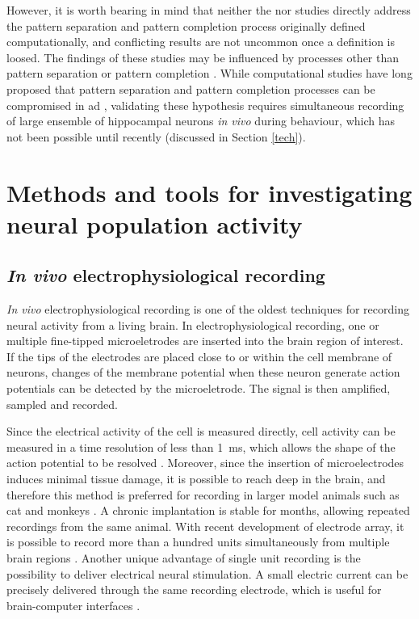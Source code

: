 However, it is worth bearing in mind that neither the \citet{palmer11} nor \citet{ally13} studies directly address the pattern separation and pattern completion process originally defined computationally, and conflicting results are not uncommon once a definition is loosed.  The findings of these studies may be influenced by processes other than pattern separation or pattern completion \citep{santoro13}. While computational studies have long proposed that pattern separation and pattern completion processes can be compromised in \gls{ad} \citep{horn93, hasselmo94, hasselmo97}, validating these hypothesis requires simultaneous recording of large ensemble of hippocampal neurons \textit{in vivo} during behaviour, which has not been possible until recently (discussed in Section \ref{tech}).  

\section{Methods and tools for investigating neural population activity \label{tech}}
\subsection{\textit{In vivo} electrophysiological recording}
\textit{In vivo} electrophysiological recording is one of the oldest techniques for recording neural activity from a living brain. In electrophysiological recording, one or multiple fine-tipped microeletrodes are inserted into the brain region of interest. If the tips of the electrodes are placed close to or within the cell membrane of neurons, changes of the membrane potential when these neuron generate action potentials can be detected by the microeletrode. The signal is then amplified, sampled and recorded. 

Since the electrical activity of the cell is measured directly, cell activity can be measured in a time resolution of less than \SI{1}{\ms}, which allows the shape of the action potential to be resolved \citep{lutcke13}. Moreover, since the insertion of microelectrodes induces minimal tissue damage, it is possible to reach deep in the brain, and therefore this method is preferred for recording in larger model animals such as cat and monkeys \citep{lutcke13}. A chronic implantation is stable for months, allowing repeated recordings from the same animal. With recent development of electrode array, it is possible to record more than a hundred units simultaneously from multiple brain regions \citep{berenyi14, xie16}. Another unique advantage of single unit recording is the possibility to deliver electrical neural stimulation. A small electric current can be precisely delivered through the same recording electrode, which is useful for brain-computer interfaces \citep{hatsopoulos09}. 

